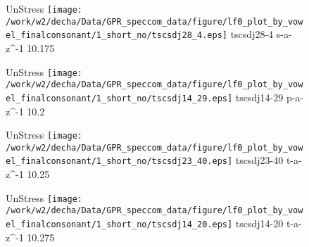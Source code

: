 \documentclass{article}
\begin{document}
\begin{figure}[t]
\begin{minipage}[b]{.24\textwidth}
UnStress
\centering
\texttt{[image: /work/w2/decha/Data/GPR\_speccom\_data/figure/lf0\_plot\_by\_vowel\_finalconsonant/1\_short\_no/tscsdj28\_4.eps]}
tscsdj28-4 s-a-z\textasciicircum-1 10.175
\end{minipage}
\begin{minipage}[b]{.24\textwidth}
UnStress
\centering
\texttt{[image: /work/w2/decha/Data/GPR\_speccom\_data/figure/lf0\_plot\_by\_vowel\_finalconsonant/1\_short\_no/tscsdj14\_29.eps]}
tscsdj14-29 p-a-z\textasciicircum-1 10.2
\end{minipage}
\begin{minipage}[b]{.24\textwidth}
UnStress
\centering
\texttt{[image: /work/w2/decha/Data/GPR\_speccom\_data/figure/lf0\_plot\_by\_vowel\_finalconsonant/1\_short\_no/tscsdj23\_40.eps]}
tscsdj23-40 t-a-z\textasciicircum-1 10.25
\end{minipage}
\begin{minipage}[b]{.24\textwidth}
UnStress
\centering
\texttt{[image: /work/w2/decha/Data/GPR\_speccom\_data/figure/lf0\_plot\_by\_vowel\_finalconsonant/1\_short\_no/tscsdj14\_20.eps]}
tscsdj14-20 t-a-z\textasciicircum-1 10.275
\end{minipage}
\end{figure}
\end{document}
